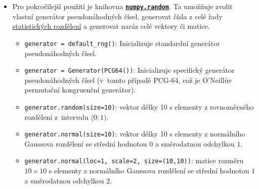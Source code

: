 \documentclass[a4paper,11pt,twoside]{article}
\def\code#1{\textnormal{\texttt{#1}}}
\def\file#1{\textnormal{\textbf{\texttt{#1}}}}
\theoremstyle{red}
\theoremstyle{green}
\begin{document}
\begin{itemize}
        \item 
            Pro pokročilejší použití je knihovna \file{\href{https://numpy.org/doc/stable/reference/random/index.html}{numpy.random}}.
            Ta umožňuje zvolit vlastní generátor pseudonáhodných čísel, generovat čísla z celé řady \href{https://numpy.org/doc/stable/reference/random/generator.html}{statistických rozdělení} a generovat naráz celé vektory či matice.
            \begin{itemize}
                \item \code{generator = default_rng()}: Inicializuje standardní generátor pseudonáhodných čísel.
                \item \code{generator = Generator(PCG64())}: Inicializuje specifický generátor pseudonáhodných čísel (v~tomto případě PCG-64, což je O'Neillův permutační kongruenční generátor).
                \item \code{generator.random(size=10)}: vektor délky 10 s elementy z rovnoměrného rozdělení z~intervalu $\langle 0;1)$.
                \item \code{generator.normal(size=10)}: vektor délky 10 s elementy z normálního Gaussova rozdělení se střední hodnotou $0$ a směrodatnou odchylkou $1$.
                \item \code{generator.normal(loc=1, scale=2, size=(10,10))}: matice rozměru $10\times10$ s elementy z normálního Gaussova rozdělení se střední hodnotou $1$ a směrodatnou odchylkou $2$.
            \end{itemize}            
    \end{itemize}
\end{document}
